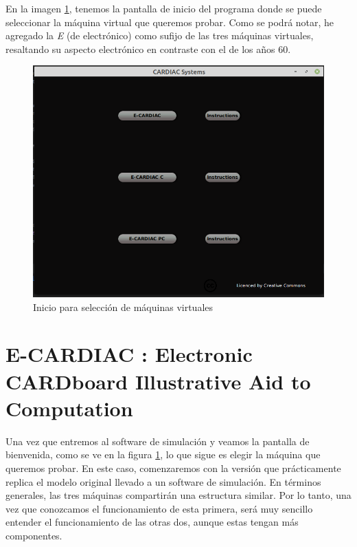 \documentclass[letterpaper,12pt,oneside]{book}
\begin{document}
    En la imagen \ref{fig:welcomeec}, tenemos la pantalla de inicio del programa
	donde se puede seleccionar la máquina virtual que queremos probar. Como se podrá notar, he agregado la \textit{E} (de electrónico) como sufijo de 		
	las tres máquinas virtuales, resaltando su aspecto electrónico en contraste con el de los años 60.


	
	\begin{figure}[h]
 			\centering
			\includegraphics[scale=0.5]{media/CARDIACC/WelcomeEC.png}
			\caption{Inicio para selección de máquinas virtuales}
			\label{fig:welcomeec}
	\end{figure}

	\clearpage
	\section{E-CARDIAC : Electronic CARDboard Illustrative Aid to Computation}
	
	Una vez que entremos al software de simulación y veamos la pantalla de bienvenida, como se ve en la figura \ref{fig:welcomeec}, lo que sigue es elegir la máquina
	que queremos probar. En este caso, comenzaremos con la versión que prácticamente replica el modelo original
	llevado a un software de simulación. En términos
	generales, las tres máquinas compartirán una estructura similar. Por lo tanto, una vez que conozcamos el funcionamiento de esta primera, será muy sencillo
	entender el funcionamiento de las otras dos, aunque estas tengan más componentes.
 
\end{document}

